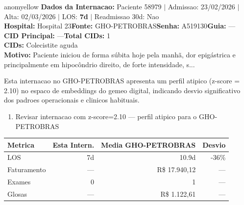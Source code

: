 \documentclass[a4paper,10pt]{article}
\begin{document}
\begin{anomalycard}[Internacao 166841 | GHO-PETROBRAS | MODERADO (z=2.10)]{anomyellow}
\textbf{Dados da Internacao:} Paciente 58979 $\mid$ Admissao: 23/02/2026 $\mid$ Alta: 02/03/2026 $\mid$ LOS: \textbf{7d} $\mid$ Readmissao 30d: Nao\\
\textbf{Hospital:} Hospital 23\quad\textbf{Fonte:} GHO-PETROBRAS\quad\textbf{Senha:} A519130\quad\textbf{Guia:} ---\\
\textbf{CID Principal:} {\small ---}\quad\textbf{Total CIDs:} 1\\

\textbf{CIDs:} {\scriptsize Colecistite aguda}\\

\textbf{Motivo:} {\scriptsize Paciente iniciou de forma súbita hoje pela manhã, dor epigástrica e principalmente em hipocôndrio direito, de forte intensidade, s...}\\

\vspace{2pt}\begin{tcolorbox}[colback=severityred!20,colframe=anomyellow,title={\textbf{Interpretacao de Negocio}},fonttitle=\bfseries\small,left=4pt,right=4pt,top=3pt,bottom=3pt]
{\small Esta internacao no GHO-PETROBRAS apresenta um perfil atipico (z-score = 2.10) no espaco de embeddings do gemeo digital, indicando desvio significativo dos padroes operacionais e clinicos habituais.}
\end{tcolorbox}
\begin{tcolorbox}[colback=severityyellow!30,colframe=anomorange,title={\textbf{Recomendacoes Especificas}},fonttitle=\bfseries\small,left=4pt,right=4pt,top=3pt,bottom=3pt]
\begin{enumerate}[nosep,leftmargin=16pt]
\item {\small Revisar internacao com z-score=2.10 --- perfil atipico para o GHO-PETROBRAS}
\end{enumerate}
\end{tcolorbox}
\begin{center}\begin{tabular}{l r r r}\toprule\textbf{Metrica} & \textbf{Esta Intern.} & \textbf{Media GHO-PETROBRAS} & \textbf{Desvio} \\\midrule
LOS & 7d & 10.9d & -36\% \\
Faturamento & --- & R\$ 17.940,12 & --- \\
Exames & 0 & 1 & --- \\
Glosas & --- & R\$ 1.122,61 & --- \\
\bottomrule\end{tabular}\end{center}


\end{anomalycard}
\end{document}
